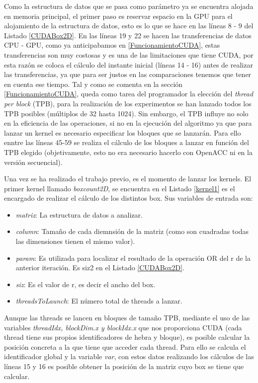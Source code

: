 Como la estructura de datos que se pasa como parámetro ya se encuentra alojada en memoria principal, el primer paso es reservar espacio en la GPU para el alojamiento de la estructura de datos, esto es lo que se hace en las líneas 8 - 9 del Listado \ref{CUDABox2D}. En las líneas 19 y 22 se hacen las transferencias de datos CPU - GPU, como ya anticipabamos en \ref{FuncionamientoCUDA}, estas transferencias son muy costosas y es una de las limitaciones que tiene CUDA, por esta razón se coloca el cálculo del instante inicial (líneas 14 - 16) antes de realizar las transferencias, ya que para ser justos en las comparaciones tenemos que tener en cuenta ese tiempo.
Tal y como se comenta en la sección \ref{FuncionamientoCUDA}, queda como tarea del programador la elección del \textit{thread per block} (TPB), para la realización de los experimentos se han lanzado todos los TPB posibles (múltiplos de 32 hasta 1024). Sin embargo, el TPB influye no solo en la eficiencia de las operaciones, si no en la ejecución del algoritmo ya que para lanzar un kernel es necesario especificar los bloques que se lanzarán. Para ello enntre las líneas 45-59 se realiza el cálculo de los bloques a lanzar en función del TPB elegido (objetivamente, esto no era necesario hacerlo con OpenACC ni en la versión secuencial).

Una vez se ha realizado el trabajo previo, es el momento de lanzar los kernels. El primer kernel llamado \textit{boxcount2D}, se encuentra en el Listado \ref{kernel1} es el encargado de realizar el cálculo de los distintos box. Sus variables de entrada son:
\begin{itemize}
    \item \textit{matriz}: La estructura de datos a analizar.
    \item \textit{column}: Tamaño de cada diemnsión de la matriz (como son cuadradas todas las dimensiones tienen el mismo valor).
    \item \textit{param}:  Es utilizada para localizar el resultado de la operación OR del r de la anterior iteración. Es siz2 en el Listado \ref{CUDABox2D}.
    \item \textit{siz}: Es el valor de r, es decir el ancho del box.
    \item \textit{threadsToLaunch}: El número total de threads a lanzar.
\end{itemize}

Aunque las threads se lancen en bloques de tamaño TPB, mediante el uso de las variables \textit{threadIdx, blockDim.x y blockIdx.x} que nos proporciona CUDA (cada thread tiene sus propios identificadores de hebra y bloque), es posible calcular la posición concreta a la que tiene que acceder cada thread. Para ello se calcula el identificador global y la variable \textit{var}, con estos datos realizando los cálculos de las líneas 15 y 16 es posible obtener la posición de la matriz cuyo box se tiene que calcular.

